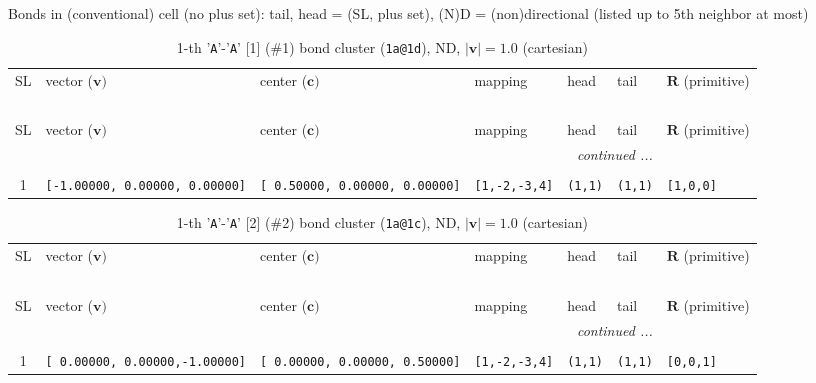 \documentclass[fleqn,10pt,landscape]{jsarticle}
\begin{document}
\noindent Bonds in (conventional) cell (no plus set): tail, head = (SL, plus set), (N)D = (non)directional (listed up to 5th neighbor at most)

\renewcommand{\arraystretch}{1.6}
\begin{longtable}[l]{cllllll}
\captionsetup{justification=raggedright, singlelinecheck=off}
\caption{1-th '\texttt{A}'-'\texttt{A}' [1] (\#1) bond cluster (\texttt{1a@1d}), ND, $|\bm{v}|=1.0$ (cartesian)}
 \\
 \hline \hline
SL & vector ($\bm{v})$ & center ($\bm{c})$ & mapping & head & tail & $\bm{R}$ (primitive) \\ \hline \endfirsthead

\multicolumn{6}{l}{\tablename\ \thetable{}} \\
 \hline \hline
SL & vector ($\bm{v})$ & center ($\bm{c})$ & mapping & head & tail & $\bm{R}$ (primitive) \\ \hline \endhead

 \hline \hline
\multicolumn{6}{r}{\footnotesize\it continued ...} \\ \endfoot

 \hline \hline
\multicolumn{6}{r}{} \\ \endlastfoot

1 & \texttt{[-1.00000, 0.00000, 0.00000]} & \texttt{[ 0.50000, 0.00000, 0.00000]} & \texttt{[1,-2,-3,4]} & \texttt{(1,1)} & \texttt{(1,1)} & \texttt{[1,0,0]} \\
\end{longtable}
\renewcommand{\arraystretch}{1.6}
\begin{longtable}[l]{cllllll}
\captionsetup{justification=raggedright, singlelinecheck=off}
\caption{1-th '\texttt{A}'-'\texttt{A}' [2] (\#2) bond cluster (\texttt{1a@1c}), ND, $|\bm{v}|=1.0$ (cartesian)}
 \\
 \hline \hline
SL & vector ($\bm{v})$ & center ($\bm{c})$ & mapping & head & tail & $\bm{R}$ (primitive) \\ \hline \endfirsthead

\multicolumn{6}{l}{\tablename\ \thetable{}} \\
 \hline \hline
SL & vector ($\bm{v})$ & center ($\bm{c})$ & mapping & head & tail & $\bm{R}$ (primitive) \\ \hline \endhead

 \hline \hline
\multicolumn{6}{r}{\footnotesize\it continued ...} \\ \endfoot

 \hline \hline
\multicolumn{6}{r}{} \\ \endlastfoot

1 & \texttt{[ 0.00000, 0.00000,-1.00000]} & \texttt{[ 0.00000, 0.00000, 0.50000]} & \texttt{[1,-2,-3,4]} & \texttt{(1,1)} & \texttt{(1,1)} & \texttt{[0,0,1]} \\
\end{longtable}
\end{document}
